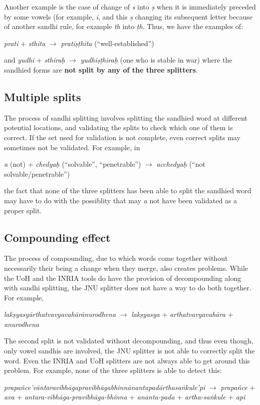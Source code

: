 \documentclass[11pt]{article}
\begin{document}
 Another example is the case of change of \textit{s} into \textit{\d{s}} when it is immediately preceded by some vowels (for example, \textit{i}, and this \textit{\d{s}} changing its subsequent letter because of another sandhi rule, for example  \textit{th} into \textit{\d{t}h}. Thus, we have the examples of:
 
                    \textit{prati} + \textit{sthita} $\rightarrow$ \textit{prati\d{s}\d{t}hita} (``well-established'')
                     
                     
and   \textit{yudhi} + \textit{sthira\d{h}} $\rightarrow$ \textit{yudhi\d{s}\d{t}hira\d{h}}  (one who is stable in war)
where the sandhied forms are \textbf{not split by any of the three splitters}.


\subsection{Multiple splits} 
The process of sandhi splitting involves splitting the sandhied word at different potential locations, and validating the splits to check which one of them is correct. If the set used for validation is not complete, even correct splits may sometimes not be validated. For example, in 

   \textit{a} (not) + \textit{chedya\d{h}} (``solvable'', ``penetrable'') $\rightarrow$ \textit{acchedya\d{h}} (``not solvable/penetrable'')
   
the fact that none of the three splitters has been able to split the sandhied word may have to do with the possiblity that may \textit{a} not have been validated as a proper split.


\subsection{Compounding effect}
The process of compounding, due to which words come together without necessarily their being a change when they merge, also creates problems. While the UoH and the INRIA tools do have the provision of decompounding along with sandhi splitting, the JNU splitter does not have a way to do both together.
For example,

\textit{lak\d{s}yasy\={a}rthatvavyavah\={a}r\={a}nurodhena} $\rightarrow$  \textit{lak\d{s}yasya} + \textit{arthatvavyavah\={a}ra} + \textit{anurodhena} 

The second split is not validated without decompounding, and thus even though, only vowel sandhis are involved, the JNU splitter is not able to correctly split the word.  
Even the INRIA and UoH splitters are not always able to get around this problem.
For example, none of the three splitters is able to detect this:

\textit{prapa\~{n}ce'v\={a}ntaravibh\={a}gapravibh\={a}gabhinn\={a}nantapad\={a}rthasa\.{n}kule'pi} $\rightarrow$ \textit{prapa\~{n}ce} + \textit{ava} + \textit{antara-vibh\={a}ga-pravibh\={a}ga-bhinna} + \textit{ananta-pada} + \textit{artha-sa\.{n}kule} + \textit{api}
\end{document}
